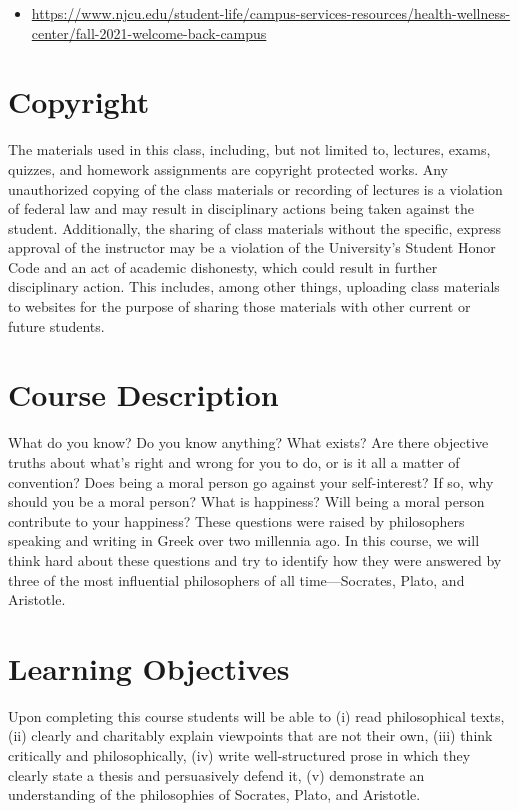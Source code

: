 \documentclass[article,oneside]{memoir}
\begin{document}
\begin{itemize}
\item \href{https://www.njcu.edu/student-life/campus-services-resources/health-wellness-center/fall-2021-welcome-back-campus}{https://www.njcu.edu/student-life/campus-services-resources/health-wellness-center/fall-2021-welcome-back-campus}
\end{itemize}




\section{Copyright}
The materials used in this class, including, but not limited to, lectures, exams, quizzes, and homework assignments are copyright protected works.  Any unauthorized copying of the class materials or recording of lectures is a violation of federal law and may result in disciplinary actions being taken against the student.  Additionally, the sharing of class materials without the specific, express approval of the instructor may be a violation of the University's Student Honor Code and an act of academic dishonesty, which could result in further disciplinary action.  This includes, among other things, uploading class materials to websites for the purpose of sharing those materials with other current or future students. 

\section{Course Description}

What do you know? Do you know anything? What exists? Are there objective truths about what’s right and wrong for you to do, or is it all a matter of convention? Does being a moral person go against your self-interest? If so, why should you be a moral person? What is happiness? Will being a moral person contribute to your happiness? These questions were raised by philosophers speaking and writing in Greek over two millennia ago. In this course, we will think hard about these questions and try to identify how they were answered by three of the most influential philosophers of all time---Socrates, Plato, and Aristotle. 

\section{Learning Objectives}

Upon completing this course students will be able to (i) read philosophical texts, (ii) clearly and charitably explain viewpoints that
are not their own, (iii) think critically and philosophically, (iv) write well-structured prose in which they clearly state a thesis and persuasively defend it, (v) demonstrate an understanding of the philosophies of Socrates, Plato, and Aristotle.
\end{document}
